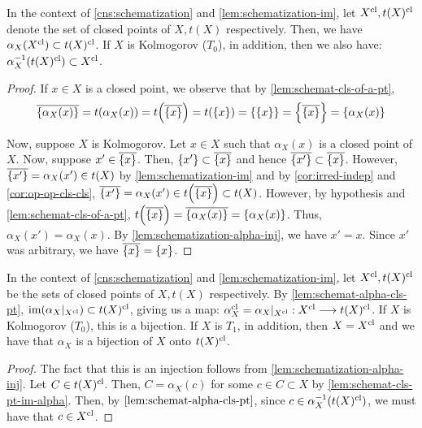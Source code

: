\begin{lem}\label{lem:schemat-alpha-cls-pt}
In the context of \cref{cns:schematization} and \cref{lem:schematization-im},
let $X^{\mathrm{cl}}, t(X)^{\mathrm{cl}}$ denote the set of closed points of $X, t(X)$ respectively.
Then, we have $\alpha_X(X^{\mathrm{cl}}) \subset t(X)^{\mathrm{cl}}$.
If $X$ is Kolmogorov ($T_0$), in addition, then we also have:
$\alpha_X^{-1}(t(X)^{\mathrm{cl}}) \subset X^{\mathrm{cl}}$.
\end{lem}
\begin{proof}
If $x \in X$ is a closed point, we observe that by
\cref{lem:schemat-cls-of-a-pt},
\[
\cls{\set{\alpha_X(x)}}
= t(\alpha_X(x))
= t\br{\cls{\set{x}}}
= t(\set{x})
= \set{\set{x}} 
= \set{\cls{\set{x}}}
= \set{\alpha_X(x)}
\]

Now, suppose $X$ is Kolmogorov. Let $x \in X$ such that $\alpha_X(x)$
is a closed point of $X$. Now, suppose $x' \in \cls{\set{x}}$.
Then, $\set{x'} \subset \cls{\set{x}}$ and hence
$\cls{\set{x'}} \subset \cls{\set{x}}$. However,
$\cls{\set{x'}} = \alpha_X(x') \in t(X)$ by \cref{lem:schematization-im}
and by \cref{cor:irred-indep} and \cref{cor:op-op-cls-cls},
$\cls{\set{x'}} = \alpha_X(x') \in t\br{\cls{\set{x}}} \subset t(X)$.
However, by hypothesis and \cref{lem:schemat-cls-of-a-pt},
$t\br{\cls{\set{x}}} = \cls{\set{\alpha_X(x)}} = \set{\alpha_X(x)}$.
Thus, $\alpha_X(x') = \alpha_X(x)$. By \cref{lem:schematization-alpha-inj},
we have $x' = x$. Since $x'$ was arbitrary, we have
$\cls{\set{x}} = \set{x}$.
\end{proof}

\begin{thm}\label{thm:schemat-cls-pt-im-alpha}
In the context of \cref{cns:schematization} and \cref{lem:schematization-im},
let $X^{\mathrm{cl}}, t(X)^{\mathrm{cl}}$ be the sets of closed points of
$X, t(X)$ respectively. By \cref{lem:schemat-alpha-cls-pt},
$\mathrm{im}(\alpha_X|_{X^{\mathrm{cl}}}) \subset t(X)^{\mathrm{cl}}$, giving us a map:
$\alpha_X^\cl = \alpha_X|_{X^\cl} : X^\cl \to t(X)^\cl$.
If $X$ is Kolmogorov ($T_0$), this is a bijection.
If $X$ is $T_1$, in addition, then $X = X^{\mathrm{cl}}$ and we have that
$\alpha_X$ is a bijection of $X$ onto $t(X)^{\mathrm{cl}}$.
\end{thm}
\begin{proof}
The fact that this is an injection follows from
\cref{lem:schematization-alpha-inj}. Let $C \in t(X)^{\mathrm{cl}}$. Then,
$C = \alpha_X(c)$ for some $c \in C \subset X$ by
\cref{lem:schemat-cls-pt-im-alpha}. Then, by $\cref{lem:schemat-alpha-cls-pt}$,
since $c \in \alpha_X^{-1}(t(X)^{\mathrm{cl}})$, we must have that $c \in X^{\mathrm{cl}}$.
\end{proof}

